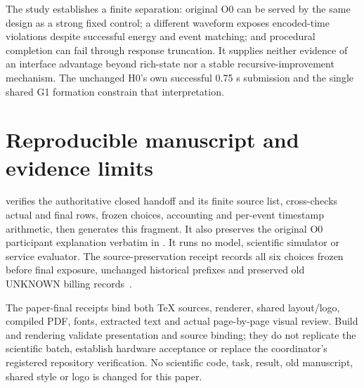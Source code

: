 The study establishes a finite separation: original O0 can be served by the
same design as a strong fixed control; a different waveform exposes encoded-time
violations despite successful energy and event matching; and procedural
completion can fail through response truncation. It supplies neither evidence
of an interface advantage beyond rich-state nor a stable recursive-improvement
mechanism. The unchanged H0's own successful 0.75 s submission and the single
shared G1 formation constrain that interpretation.

\section{Reproducible manuscript and evidence limits}
 verifies the authoritative closed handoff and its
finite source list, cross-checks actual and final rows, frozen choices,
accounting and per-event timestamp arithmetic, then generates this fragment.
It also preserves the original O0 participant explanation verbatim in
. It runs no model, scientific simulator or service
evaluator. The source-preservation receipt records all six choices frozen
before final exposure, unchanged historical prefixes and preserved old UNKNOWN
billing records~\cite{preservation}.

The paper-final receipts bind both TeX sources, renderer, shared layout/logo,
compiled PDF, fonts, extracted text and actual page-by-page visual review.
Build and rendering validate presentation and source binding; they do not
replicate the scientific batch, establish hardware acceptance or replace the
coordinator's registered repository verification. No scientific code, task,
result, old manuscript, shared style or logo is changed for this paper.

